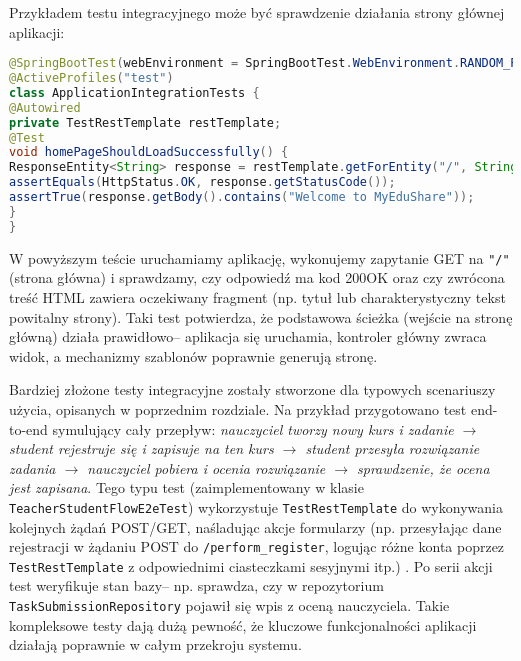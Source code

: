  Przykładem testu integracyjnego może być sprawdzenie działania strony głównej aplikacji: \begin{lstlisting}[language=Java,
  caption={integracyjny test. Źródło: opracowanie własne},
  label={lst:integrationTest},
  captionpos=b]
@SpringBootTest(webEnvironment = SpringBootTest.WebEnvironment.RANDOM_PORT)
@ActiveProfiles("test")
class ApplicationIntegrationTests {
@Autowired
private TestRestTemplate restTemplate;
@Test
void homePageShouldLoadSuccessfully() {
ResponseEntity<String> response = restTemplate.getForEntity("/", String.class);
assertEquals(HttpStatus.OK, response.getStatusCode());
assertTrue(response.getBody().contains("Welcome to MyEduShare"));
}
}
\end{lstlisting} 
W powyższym teście uruchamiamy aplikację, wykonujemy zapytanie GET na
\texttt{"/"} (strona główna) i sprawdzamy, czy odpowiedź ma kod 200OK oraz
czy zwrócona treść HTML zawiera oczekiwany fragment (np. tytuł lub
charakterystyczny tekst powitalny strony). Taki test potwierdza, że
podstawowa ścieżka (wejście na stronę główną) działa prawidłowo-- aplikacja
się uruchamia, kontroler główny zwraca widok, a mechanizmy szablonów
poprawnie generują stronę.

Bardziej złożone testy integracyjne zostały stworzone dla typowych
scenariuszy użycia, opisanych w poprzednim rozdziale. Na przykład
przygotowano test end-to-end symulujący cały przepływ:
\textit{nauczyciel tworzy nowy kurs i zadanie $\to$ student rejestruje się i
zapisuje na ten kurs $\to$ student przesyła rozwiązanie zadania $\to$
nauczyciel pobiera i ocenia rozwiązanie $\to$ sprawdzenie, że ocena jest
zapisana}. Tego typu test (zaimplementowany w klasie
\texttt{TeacherStudentFlowE2eTest}) wykorzystuje \texttt{TestRestTemplate}
do wykonywania kolejnych żądań POST/GET, naśladując akcje formularzy (np.
przesyłając dane rejestracji w żądaniu POST do
\texttt{/perform\_register}, logując różne konta poprzez
\texttt{TestRestTemplate} z odpowiednimi ciasteczkami sesyjnymi itp.) \cite{spring-docs}. Po
serii akcji test weryfikuje stan bazy-- np. sprawdza, czy w repozytorium
\texttt{TaskSubmissionRepository} pojawił się wpis z oceną nauczyciela. Takie
kompleksowe testy dają dużą pewność, że kluczowe funkcjonalności aplikacji
działają poprawnie w całym przekroju systemu.

